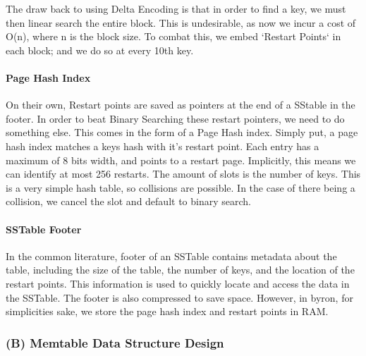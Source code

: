 \documentclass[10pt]{article}
\begin{document}
The draw back to using Delta Encoding is that in order to find a key, we must then linear search the entire block. This is undesirable, as now we incur a cost of O(n), where n is the block size. 
To combat this, we embed `Restart Points` in each block; and we do so at every 10th key. 


\paragraph{Page Hash Index}

On their own, Restart points are saved as pointers at the end of a SStable in the footer. In order to beat Binary Searching these restart pointers, we need to do something else. This comes in the form of a Page Hash index. 
Simply put, a page hash index matches a keys hash with it's restart point. Each entry has a maximum of 8 bits width, and points to a restart page. Implicitly, this means we can identify at most 256 restarts.
The amount of slots is the number of keys. This is a very simple hash table, so collisions are possible. In the case of there being a collision, we cancel the slot and default to binary search.

\paragraph{SSTable Footer}
In the common literature, footer of an SSTable contains metadata about the table, including the size of the table, the number of keys, and the location of the restart points. This information is used to quickly locate and access the data in the SSTable. The footer is also compressed to save space.
However, in byron, for simplicities sake, we store the page hash index and restart points in RAM. 



\subsubsection*{(B) Memtable Data Structure Design}
\end{document}
